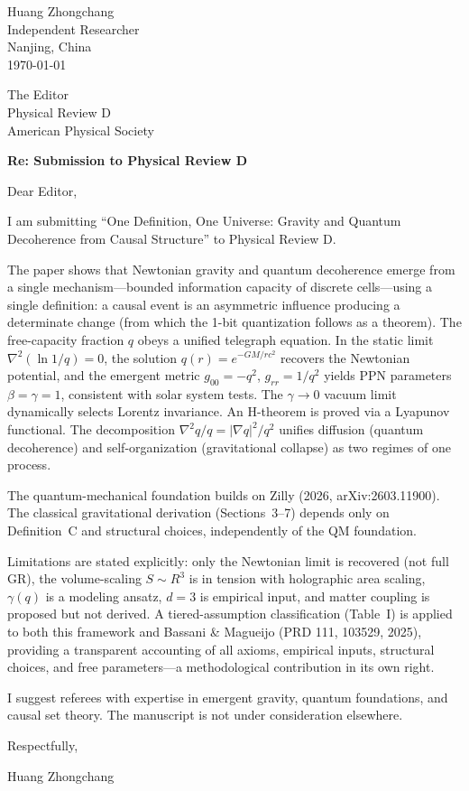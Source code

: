 \documentclass[12pt]{article}
\begin{document}
\begin{flushright}
Huang Zhongchang\\
Independent Researcher\\
Nanjing, China\\
\today
\end{flushright}

\vspace{0.3in}

\noindent The Editor\\
Physical Review D\\
American Physical Society

\vspace{0.2in}

\noindent \textbf{Re: Submission to Physical Review D}

\vspace{0.1in}

\noindent Dear Editor,

I am submitting ``One Definition, One Universe: Gravity and Quantum Decoherence from Causal Structure'' to Physical Review D.

The paper shows that Newtonian gravity and quantum decoherence emerge from a single mechanism---bounded information capacity of discrete cells---using a single definition: a causal event is an asymmetric influence producing a determinate change (from which the 1-bit quantization follows as a theorem). The free-capacity fraction $q$ obeys a unified telegraph equation. In the static limit $\nabla^2(\ln 1/q)=0$, the solution $q(r)=e^{-GM/rc^2}$ recovers the Newtonian potential, and the emergent metric $g_{00}=-q^2$, $g_{rr}=1/q^2$ yields PPN parameters $\beta=\gamma=1$, consistent with solar system tests. The $\gamma\to0$ vacuum limit dynamically selects Lorentz invariance. An H-theorem is proved via a Lyapunov functional. The decomposition $\nabla^2 q/q=|\nabla q|^2/q^2$ unifies diffusion (quantum decoherence) and self-organization (gravitational collapse) as two regimes of one process.

The quantum-mechanical foundation builds on Zilly (2026, arXiv:2603.11900). The classical gravitational derivation (Sections~3--7) depends only on Definition~C and structural choices, independently of the QM foundation.

Limitations are stated explicitly: only the Newtonian limit is recovered (not full GR), the volume-scaling $S\sim R^3$ is in tension with holographic area scaling, $\gamma(q)$ is a modeling ansatz, $d=3$ is empirical input, and matter coupling is proposed but not derived. A tiered-assumption classification (Table~I) is applied to both this framework and Bassani \& Magueijo (PRD 111, 103529, 2025), providing a transparent accounting of all axioms, empirical inputs, structural choices, and free parameters---a methodological contribution in its own right.

I suggest referees with expertise in emergent gravity, quantum foundations, and causal set theory. The manuscript is not under consideration elsewhere.

\vspace{0.15in}
\noindent Respectfully,

\vspace{0.3in}
\noindent Huang Zhongchang
\end{document}
